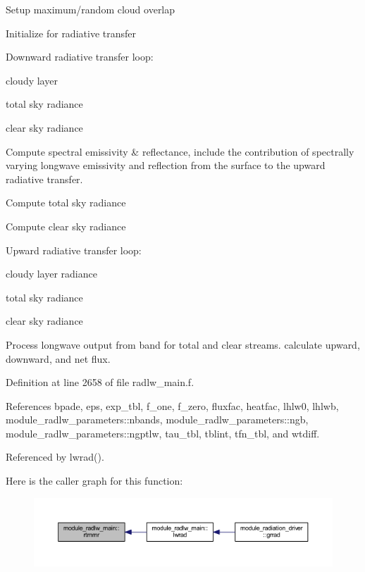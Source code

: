 \begin{DoxyEnumerate}
\item Setup maximum/random cloud overlap
\item Initialize for radiative transfer
\item Downward radiative transfer loop\+:
\begin{DoxyItemize}
\item cloudy layer
\item total sky radiance
\item clear sky radiance
\end{DoxyItemize}
\item Compute spectral emissivity \& reflectance, include the contribution of spectrally varying longwave emissivity and reflection from the surface to the upward radiative transfer.
\item Compute total sky radiance
\item Compute clear sky radiance
\item Upward radiative transfer loop\+:
\begin{DoxyItemize}
\item cloudy layer radiance
\item total sky radiance
\item clear sky radiance
\end{DoxyItemize}
\item Process longwave output from band for total and clear streams. calculate upward, downward, and net flux. 
\end{DoxyEnumerate}

Definition at line 2658 of file radlw\+\_\+main.\+f.



References bpade, eps, exp\+\_\+tbl, f\+\_\+one, f\+\_\+zero, fluxfac, heatfac, lhlw0, lhlwb, module\+\_\+radlw\+\_\+parameters\+::nbands, module\+\_\+radlw\+\_\+parameters\+::ngb, module\+\_\+radlw\+\_\+parameters\+::ngptlw, tau\+\_\+tbl, tblint, tfn\+\_\+tbl, and wtdiff.



Referenced by lwrad().



Here is the caller graph for this function\+:
\nopagebreak
\begin{figure}[H]
\begin{center}
\leavevmode
\includegraphics[width=350pt]{namespacemodule__radlw__main_ad8f07b8a0e3dfa639b970d756824b9d3_icgraph}
\end{center}
\end{figure}


